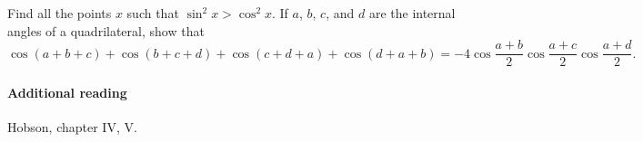 \documentclass[answers]{exam}
\begin{document}
\begin{questions}
  \question Find all the points $ x $ such that $ \sin^2 x > \cos^2 x $.
  \question If $ a $, $ b $, $ c $, and $ d $ are the internal angles of a quadrilateral,
            show that
            \begin{displaymath}
              \cos (a+b+c) + \cos(b+c+d) + \cos(c+d+a) + \cos(d+a+b) = -4\cos \frac{a + b}{2} \cos \frac{a + c}{2} \cos \frac{a + d}{2}.
            \end{displaymath}
\end{questions}

\paragraph{Additional reading} Hobson, chapter IV, V.
\end{document}
